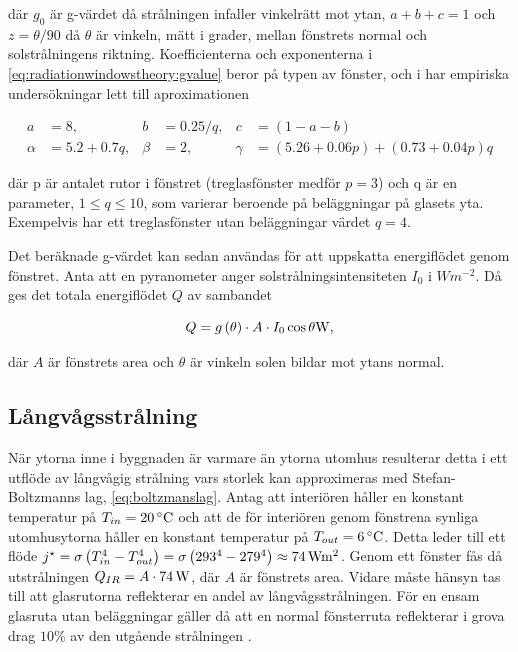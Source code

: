 där $g_0$ är g-värdet då strålningen infaller vinkelrätt mot ytan, $a+b+c=1$ och $z=\theta/90$ då $\theta$ är vinkeln, mätt i grader, mellan fönstrets normal och solstrålningens riktning. Koefficienterna och exponenterna i \eqref{eq:radiationwindowstheory:gvalue} beror på typen av fönster, och i \cite{karlssonroos99} har empiriska undersökningar lett till aproximationen

\begin{align}\label{eq:gconstants}
a & = 8, & b & = 0.25/q, & c & = (1-a-b) \nonumber \\
\alpha & = 5.2 + 0.7q, & \beta & = 2, & \gamma & = (5.26+0.06p) + (0.73+0.04p)q
\end{align}

där p är antalet rutor i fönstret (treglasfönster medför $p = 3$) och q är en parameter, $1 \le q \le 10$, som varierar beroende på beläggningar på glasets yta. Exempelvis har ett treglasfönster utan beläggningar värdet $q=4$.

Det beräknade g-värdet kan sedan användas för att uppskatta energiflödet genom fönstret. Anta att en pyranometer anger solstrålningsintensiteten $I_0$ i $\unit{W m^{-2}}$. Då ges det totala energiflödet $Q$ av sambandet 

\begin{equation}\label{eq:totalsun}
Q = g \left( \theta \right)\cdot A \cdot I_0 \cos{\theta} \unit[]{W},
\end{equation}

där $A$ är fönstrets area och $\theta$ är vinkeln solen bildar mot ytans normal.

\subsection{Långvågsstrålning}\label{IR}

När ytorna inne i byggnaden är varmare än ytorna utomhus resulterar detta i ett utflöde av långvågig strålning vars storlek kan approximeras med Stefan-Boltzmanns lag, \ref{eq:boltzmanslag}. Antag att interiören håller en konstant temperatur på $T_{in} = \unit[20]{^{\circ}C}$ och att de för interiören genom fönstrena synliga utomhusytorna håller en konstant temperatur på $T_{out} = \unit[6]{^{\circ}C}$. Detta leder till ett flöde $j^{\star} = \sigma \left( T_{in}^{4}-T_{out}^4\right) = \sigma \left( 293^4-279^4 \right) \approx \unit[74]{Wm^{2}}$. Genom ett fönster fås då utstrålningen $Q_{IR}=A\cdot\unit[74]{W}$, där $A$ är fönstrets area. Vidare måste hänsyn tas till att glasrutorna reflekterar en andel av långvågsstrålningen. För en ensam glasruta utan beläggningar gäller då att en normal fönsterruta reflekterar i grova drag $10\%$ av den utgående strålningen \cite{gelin05}.

